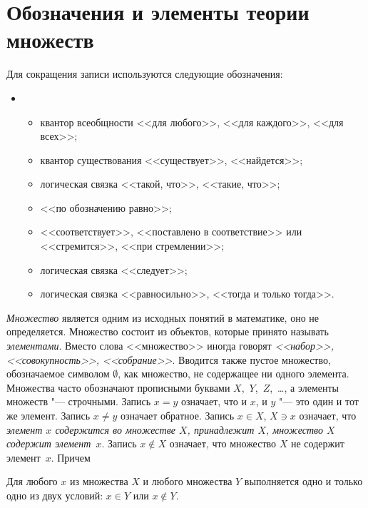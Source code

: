 \chapter*{Обозначения и элементы теории множеств}

Для сокращения записи используются следующие обозначения:
\begin{itemize}
\item[]
\begin{itemize}[noitemsep, label = ---]
\item \makebox[0pt][r]{$\forall$\hspace{0.75cm}}
квантор всеобщности <<для любого>>, <<для каждого>>, <<для всех>>;
\item \makebox[0pt][r]{$\exists$\hspace{0.75cm}}
квантор существования  <<существует>>, <<найдется>>;
\item \makebox[0pt][r]{$:$\hspace{0.75cm}}
логическая связка <<такой, что>>, <<такие, что>>;
\item \makebox[0pt][r]{$\triangleq$\hspace{0.75cm}} 
<<по обозначению равно>>;
\item \makebox[0pt][r]{$\to$\hspace{0.75cm}}
<<соответствует>>, <<поставлено в соответствие>> или <<стремится>>, <<при стремлении>>;
\item \makebox[0pt][r]{$\Rightarrow$\hspace{0.75cm}}
логическая связка <<следует>>;
\item \makebox[0pt][r]{$\Longleftrightarrow$\hspace{0.75cm}}
логическая связка <<равносильно>>, <<тогда и только тогда>>.
\end{itemize}
\end{itemize}

\textit{Множество} является одним из исходных понятий в математике, оно не определяется. Множество состоит из объектов, которые принято называть \textit{элементами}. Вместо слова <<множество>> иногда говорят \textit{<<набор>>, <<совокупность>>, <<собрание>>}. Вводится также пустое множество, обозначаемое символом $\emptyset$, как множество, не содержащее ни одного элемента. Множества часто обозначают прописными буквами $X$,~$Y$,~$Z$,~\ldots, а элементы множеств "--- строчными.  Запись $x = y$ означает, что и $x$, и $y$ "--- это один и тот же элемент. Запись $x\neq y$ означает обратное. Запись $x\in X$, $X\ni x$ означает, что \textit{элемент $x$ содержится во множестве $X$, принадлежит $X$, множество $X$ содержит элемент~$x$}. Запись $x \notin X$ означает, что множество $X$ не содержит элемент~$x$. Причем
\begin{axiome}
Для любого $x$ из множества $X$ и любого множества $Y$ выполняется одно и только одно из двух условий: $x\in Y$ или $x\notin Y$.
\end{axiome}

